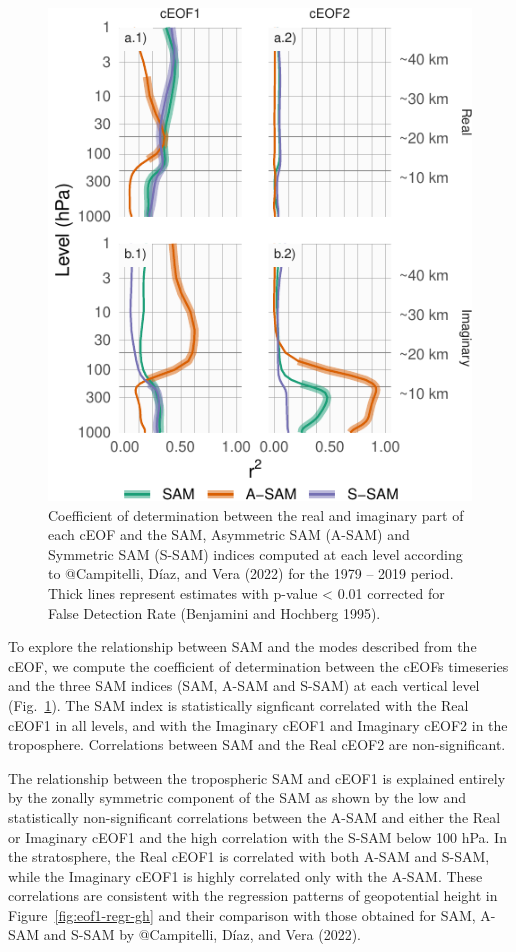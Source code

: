 \documentclass[smallextended]{svjour3}       %
\begin{document}
\begin{figure}
\centering
\includegraphics{../figures/sam-eof-vertical-1.pdf}
\caption{\label{fig:sam-eof-vertical}Coefficient of determination between the real and imaginary part of each cEOF and the SAM, Asymmetric SAM (A-SAM) and Symmetric SAM (S-SAM) indices computed at each level according to @Campitelli, Díaz, and Vera (2022) for the 1979 -- 2019 period. Thick lines represent estimates with p-value \textless{} 0.01 corrected for False Detection Rate (Benjamini and Hochberg 1995).}
\end{figure}

To explore the relationship between SAM and the modes described from the cEOF, we compute the coefficient of determination between the cEOFs timeseries and the three SAM indices (SAM, A-SAM and S-SAM) at each vertical level (Fig.~\ref{fig:sam-eof-vertical}).
The SAM index is statistically signficant correlated with the Real cEOF1 in all levels, and with the Imaginary cEOF1 and Imaginary cEOF2 in the troposphere.
Correlations between SAM and the Real cEOF2 are non-significant.

The relationship between the tropospheric SAM and cEOF1 is explained entirely by the zonally symmetric component of the SAM as shown by the low and statistically non-significant correlations between the A-SAM and either the Real or Imaginary cEOF1 and the high correlation with the S-SAM below 100 hPa.
In the stratosphere, the Real cEOF1 is correlated with both A-SAM and S-SAM, while the Imaginary cEOF1 is highly correlated only with the A-SAM.
These correlations are consistent with the regression patterns of geopotential height in Figure~\ref{fig:eof1-regr-gh} and their comparison with those obtained for SAM, A-SAM and S-SAM by @Campitelli, Díaz, and Vera (2022).
\end{document}
